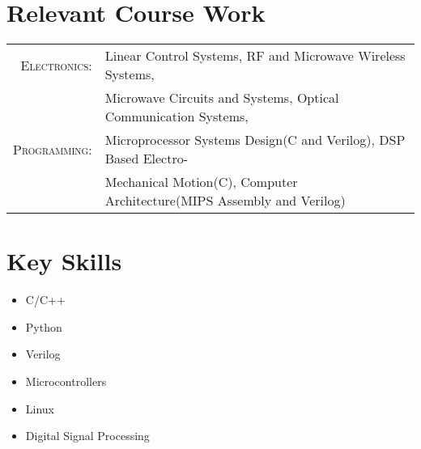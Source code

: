 \documentclass[a4paper,10pt]{article} %
\begin{document}



\section{Relevant Course Work}

\begin{tabular}{rl}
\textsc{Electronics:} & Linear Control Systems, RF and Microwave Wireless Systems, \\
& Microwave Circuits and Systems, Optical Communication Systems, \\
 

\textsc{Programming:} & Microprocessor Systems Design(C and Verilog), DSP Based Electro- \\ 
& Mechanical Motion(C), Computer Architecture(MIPS Assembly and Verilog) \\

\end{tabular}


\section{Key Skills}

\begin{multicols}{2}
\begin{itemize}
    \item C/C++
    \item Python
    \item Verilog
    \item Microcontrollers
    \item Linux
    \item Digital Signal Processing

\end{itemize}
\end{multicols}



\end{document}
